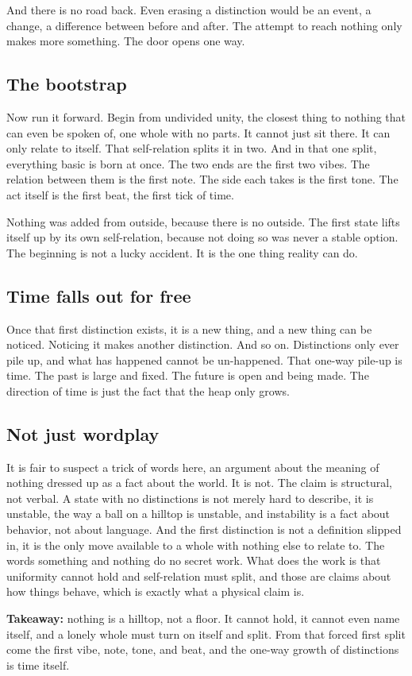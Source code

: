 And there is no road back. Even erasing a distinction would be an event, a change, a difference between before and after. The attempt to reach nothing only makes more something. The door opens one way.

\subsection{The bootstrap}

Now run it forward. Begin from undivided unity, the closest thing to nothing that can even be spoken of, one whole with no parts. It cannot just sit there. It can only relate to itself. That self-relation splits it in two. And in that one split, everything basic is born at once. The two ends are the first two vibes. The relation between them is the first note. The side each takes is the first tone. The act itself is the first beat, the first tick of time.

Nothing was added from outside, because there is no outside. The first state lifts itself up by its own self-relation, because not doing so was never a stable option. The beginning is not a lucky accident. It is the one thing reality can do.

\subsection{Time falls out for free}

Once that first distinction exists, it is a new thing, and a new thing can be noticed. Noticing it makes another distinction. And so on. Distinctions only ever pile up, and what has happened cannot be un-happened. That one-way pile-up is time. The past is large and fixed. The future is open and being made. The direction of time is just the fact that the heap only grows.

\subsection{Not just wordplay}

It is fair to suspect a trick of words here, an argument about the meaning of nothing dressed up as a fact about the world. It is not. The claim is structural, not verbal. A state with no distinctions is not merely hard to describe, it is unstable, the way a ball on a hilltop is unstable, and instability is a fact about behavior, not about language. And the first distinction is not a definition slipped in, it is the only move available to a whole with nothing else to relate to. The words something and nothing do no secret work. What does the work is that uniformity cannot hold and self-relation must split, and those are claims about how things behave, which is exactly what a physical claim is.

\textbf{Takeaway:} nothing is a hilltop, not a floor. It cannot hold, it cannot even name itself, and a lonely whole must turn on itself and split. From that forced first split come the first vibe, note, tone, and beat, and the one-way growth of distinctions is time itself.

